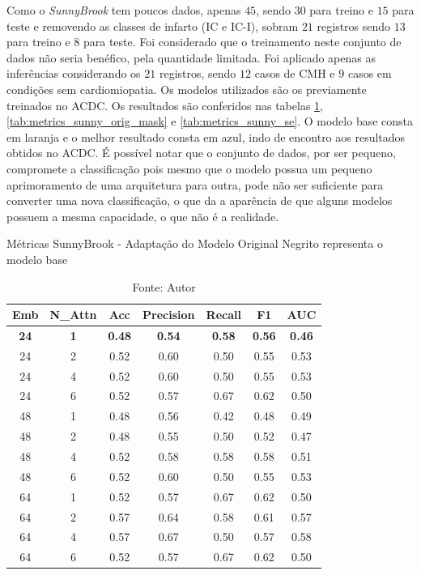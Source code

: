 Como o \textit{SunnyBrook} tem poucos dados, apenas $45$, sendo $30$ para treino e $15$ para teste e removendo as classes de infarto (IC e IC-I), sobram $21$ registros sendo $13$ para treino e $8$ para teste. Foi considerado que o treinamento neste conjunto de dados não seria benéfico, pela quantidade limitada. Foi aplicado apenas as inferências considerando os $21$ registros, sendo $12$ casos de \gls{CMH} e $9$ casos em condições sem cardiomiopatia. Os modelos utilizados são os previamente treinados no \gls{ACDC}. Os resultados são conferidos nas tabelas \ref{tab:metrics_sunny_orig}, \ref{tab:metrics_sunny_orig_mask} e \ref{tab:metrics_sunny_se}. O modelo base consta em laranja e o melhor resultado consta em azul, indo de encontro aos resultados obtidos no \gls{ACDC}. É possível notar que o conjunto de dados, por ser pequeno, compromete a classificação pois mesmo que o modelo possua um pequeno aprimoramento de uma arquitetura para outra, pode não ser suficiente para converter uma nova classificação, o que da a aparência de que alguns modelos possuem a mesma capacidade, o que não é a realidade.


\begin{table}[htbp]
\centering
\caption{Métricas SunnyBrook - Adaptação do Modelo Original
\newline Negrito representa o modelo base}
\begin{tabular}{ccccccc}
\toprule
\textbf{Emb} & \textbf{N\_Attn} & \textbf{Acc} & \textbf{Precision} & \textbf{Recall} & \textbf{F1} & \textbf{AUC} \\
\midrule
\textbf{24} & \textbf{1} & \textbf{0.48} & \textbf{0.54} & \textbf{0.58} & \textbf{0.56} & \textbf{0.46} \\
24 & 2 & 0.52 & 0.60 & 0.50 & 0.55 & 0.53 \\
24 & 4 & 0.52 & 0.60 & 0.50 & 0.55 & 0.53 \\
24 & 6 & 0.52 & 0.57 & 0.67 & 0.62 & 0.50 \\
48 & 1 & 0.48 & 0.56 & 0.42 & 0.48 & 0.49 \\
48 & 2 & 0.48 & 0.55 & 0.50 & 0.52 & 0.47 \\
48 & 4 & 0.52 & 0.58 & 0.58 & 0.58 & 0.51 \\
48 & 6 & 0.52 & 0.60 & 0.50 & 0.55 & 0.53 \\
64 & 1 & 0.52 & 0.57 & 0.67 & 0.62 & 0.50 \\
64 & 2 & 0.57 & 0.64 & 0.58 & 0.61 & 0.57 \\
64 & 4 & 0.57 & 0.67 & 0.50 & 0.57 & 0.58 \\
64 & 6 & 0.52 & 0.57 & 0.67 & 0.62 & 0.50 \\
\bottomrule
\end{tabular}
\caption*{Fonte: Autor}
\label{tab:metrics_sunny_orig}
\end{table}


